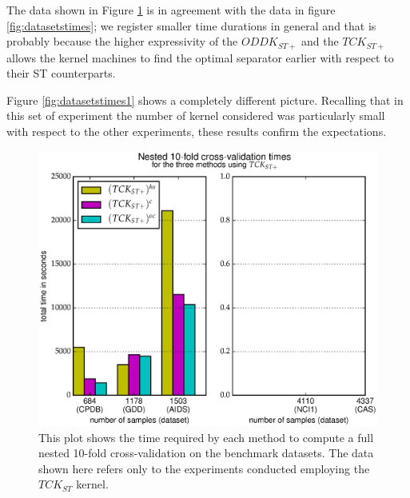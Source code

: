 The data shown in Figure \ref{fig:datasetstimes2} is in agreement with the data
in figure \ref{fig:datasetstimes}; we register smaller time durations in general
and that is probably because the higher expressivity of the $ODDK_{ST+}$ and the
$TCK_{ST+}$ allows the kernel machines to find the optimal separator earlier with
respect to their ST counterparts.

Figure \ref{fig:datasetstimes1} shows a completely different picture.
Recalling that in this set of experiment the number of kernel considered was particularly
small with respect to the other experiments, these results confirm the expectations.

\begin{figure}[ht]
    \centering
    \includegraphics[scale=0.7]{Figures/total_times2}
    \caption{
        This plot shows the time required by each method to compute a full nested 10-fold cross-validation on the benchmark datasets.
        The data shown here refers only to the experiments conducted employing the $TCK_{ST}$ kernel.
    }
    \label{fig:datasetstimes2}
\end{figure}

